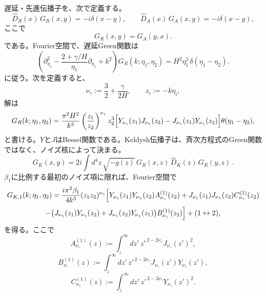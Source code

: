\documentclass[a4paper,11pt,oneside]{article}
\theoremstyle{definition}
\numberwithin{equation}{section}
\begin{document}
遅延・先進伝播子を、次で定義する。
\begin{equation}
\widehat D_R(x)\,G_R(x,y)=-i\delta(x-y),
\qquad
\widehat D_A(x)\,G_A(x,y)=-i\delta(x-y),
\end{equation}
ここで
\begin{equation}
G_R(x,y)=G_A(y,x) .
\end{equation}
である。Fourier空間で、遅延Green関数は
\begin{equation}
\left(
\partial_{\eta_1}^2
-
\frac{2+\gamma/H}{\eta_1}\partial_{\eta_1}
+k^2
\right)
G_R(k;\eta_1,\eta_2)
=
H^2\eta_1^2\,\delta(\eta_1-\eta_2) .
\end{equation}
に従う。次を定義すると、
\begin{equation}
\nu_\gamma:=\frac32+\frac{\gamma}{2H},
\qquad
z_i:=-k\eta_i ,
\end{equation}
解は
\begin{equation}
G_R(k;\eta_1,\eta_2)
=
\frac{\pi^2 H^2}{k^3}
\left(\frac{z_1}{z_2}\right)^{\nu_\gamma}
z_2^3
\Bigl[
Y_{\nu_\gamma}(z_1)J_{\nu_\gamma}(z_2)
-
J_{\nu_\gamma}(z_1)Y_{\nu_\gamma}(z_2)
\Bigr]
\theta(\eta_1-\eta_2) ,
\end{equation}
と書ける。$ Y  $と$ J  $はBessel関数である。Keldysh伝播子は、斉次方程式のGreen関数ではなく、ノイズ核によって決まる。
\begin{equation}
G_K(x,y)
=
2i\int d^4z\,\sqrt{-g(z)}\,
G_R(x,z)\,\widehat D_K(z)\,G_R(y,z)\,.
\end{equation}
\(\beta_1\)に比例する最初のノイズ項に限れば、Fourier空間で
\begin{equation}
G_{K,1}(k;\eta_1,\eta_2)
=
\frac{i\pi^2\beta_1}{4k^3}
(z_1 z_2)^{\nu_\gamma}
\Bigl[
Y_{\nu_\gamma}(z_1)Y_{\nu_\gamma}(z_2)A^{(1)}_{\nu_\gamma}(z_2)
+
J_{\nu_\gamma}(z_1)J_{\nu_\gamma}(z_2)C^{(1)}_{\nu_\gamma}(z_2)
\Bigr.
\end{equation}
\begin{equation}
\Bigl.
-
\bigl(
J_{\nu_\gamma}(z_1)Y_{\nu_\gamma}(z_2)
+
J_{\nu_\gamma}(z_2)Y_{\nu_\gamma}(z_1)
\bigr)
B^{(1)}_{\nu_\gamma}(z_2)
\Bigr]
+
(1\leftrightarrow 2) ,
\end{equation}
を得る。ここで
\begin{equation}
A^{(1)}_{\nu_\gamma}(z)
:=
\int_z^\infty dz'\,z'^{\,2-2\nu_\gamma}J_{\nu_\gamma}(z')^2 ,
\end{equation}
\begin{equation}
B^{(1)}_{\nu_\gamma}(z)
:=
\int_z^\infty dz'\,z'^{\,2-2\nu_\gamma}J_{\nu_\gamma}(z')Y_{\nu_\gamma}(z') ,
\end{equation}
\begin{equation}
C^{(1)}_{\nu_\gamma}(z)
:=
\int_z^\infty dz'\,z'^{\,2-2\nu_\gamma}Y_{\nu_\gamma}(z')^2 .
\end{equation}
\end{document}
